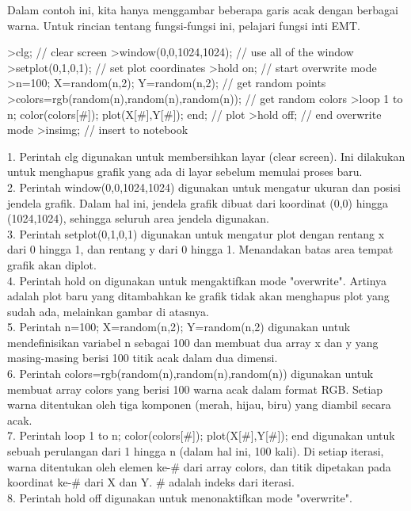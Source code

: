 \documentclass{article}
\begin{document}
\begin{eulernotebook}
\begin{eulercomment}
\begin{eulercomment}
\begin{eulercomment}
Dalam contoh ini, kita hanya menggambar beberapa garis acak dengan
berbagai warna. Untuk rincian tentang fungsi-fungsi ini, pelajari
fungsi inti EMT.
\end{eulercomment}
\begin{eulerprompt}
>clg; // clear screen
>window(0,0,1024,1024); // use all of the window
>setplot(0,1,0,1); // set plot coordinates
>hold on; // start overwrite mode
>n=100; X=random(n,2); Y=random(n,2);  // get random points
>colors=rgb(random(n),random(n),random(n)); // get random colors
>loop 1 to n; color(colors[#]); plot(X[#],Y[#]); end; // plot
>hold off; // end overwrite mode
>insimg; // insert to notebook
\end{eulerprompt}
\begin{eulercomment}
1. Perintah clg digunakan untuk membersihkan layar (clear screen). Ini
dilakukan untuk menghapus grafik yang ada di layar sebelum memulai
proses baru.\\
2. Perintah window(0,0,1024,1024) digunakan untuk mengatur ukuran dan
posisi jendela grafik. Dalam hal ini, jendela grafik dibuat dari
koordinat (0,0) hingga (1024,1024), sehingga seluruh area jendela
digunakan.\\
3. Perintah setplot(0,1,0,1) digunakan untuk mengatur plot dengan
rentang x dari 0 hingga 1, dan rentang y dari 0 hingga 1. Menandakan
batas area tempat grafik akan diplot.\\
4. Perintah hold on digunakan untuk mengaktifkan mode "overwrite".
Artinya adalah plot baru yang ditambahkan ke grafik tidak akan
menghapus plot yang sudah ada, melainkan gambar di atasnya.\\
5. Perintah n=100; X=random(n,2); Y=random(n,2) digunakan untuk
mendefinisikan variabel n sebagai 100 dan membuat dua array x dan y
yang masing-masing berisi 100 titik acak dalam dua dimensi.\\
6. Perintah colors=rgb(random(n),random(n),random(n)) digunakan untuk
membuat array colors yang berisi 100 warna acak dalam format RGB.
Setiap warna ditentukan oleh tiga komponen (merah, hijau, biru) yang
diambil secara acak.\\
7. Perintah loop 1 to n; color(colors[#]); plot(X[#],Y[#]); end
digunakan untuk sebuah perulangan dari 1 hingga n (dalam hal ini, 100
kali). Di setiap iterasi, warna ditentukan oleh elemen ke-# dari array
colors, dan titik dipetakan pada koordinat ke-# dari X dan Y. # adalah
indeks dari iterasi.\\
8. Perintah hold off digunakan untuk menonaktifkan mode "overwrite".

\end{eulercomment}
\end{eulercomment}
\end{eulercomment}
\end{eulernotebook}
\end{document}
